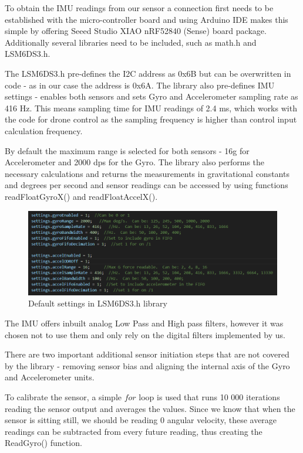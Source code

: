 To obtain the IMU readings from our sensor a connection first needs to be established with the micro-controller board and using Arduino IDE makes this simple by offering Seeed Studio XIAO nRF52840 (Sense) board package. Additionally several libraries need to be included, such as math.h and LSM6DS3.h. 

The LSM6DS3.h pre-defines the I2C address as 0x6B but can be overwritten in code - as in our case the address is 0x6A. 
The library also pre-defines IMU settings - enables both sensors and sets Gyro and Accelerometer sampling rate as 416 Hz. This means sampling time for IMU readings of 2.4 ms, which works with the code for drone control as the sampling frequency is higher than control input calculation frequency. 

By default the maximum range is selected for both sensors - 16g for Accelerometer and 2000 dps for the Gyro. The library also performs the necessary calculations and returns the measurements in gravitational constants and degrees per second and sensor readings can be accessed by using functions readFloatGyroX() and readFloatAccelX().  

\begin{figure}[H]
    \begin{center}
    \includegraphics[scale = 0.55]{pictures/IMU/Library_settings.png}
    \end{center}
    \caption{Default settings in LSM6DS3.h library}
    \label{fig:my_label}
\end{figure}


The IMU offers inbuilt analog Low Pass and High pass filters, however it was chosen not to use them and only rely on the digital filters implemented by us.

There are two important additional sensor initiation steps that are not covered by the library - removing sensor bias and aligning the internal axis of the Gyro and Accelerometer units. 

To calibrate the sensor, a simple $for$ loop is used that runs 10 000 iterations reading the sensor output and averages the values. Since we know that when the sensor is sitting still, we should be reading 0 angular velocity, these average readings can be subtracted from every future reading, thus creating the ReadGyro() function. 


